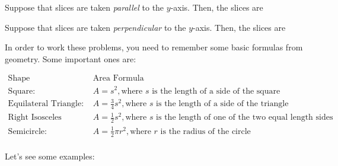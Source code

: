 \documentclass{ximera}
\begin{document}
\begin{question}
Suppose that slices are taken \emph{parallel} to the $y$-axis.  Then, the slices are
\begin{multipleChoice}
\end{multipleChoice}

Suppose that slices are taken \emph{perpendicular} to the $y$-axis.  Then, the slices are
\begin{multipleChoice}
\end{multipleChoice}
\end{question}

\begin{remark}
In order to work these problems, you need to remember some basic formulas from geometry.  Some important ones are:

\[
\begin{array}{ll}
\textrm{Shape} & \textrm{Area Formula} \\
\textrm{Square:} & A=s^2, \textrm{where } s \textrm{ is the length of a side of the square} \\ 
\textrm{Equilateral Triangle:} & A=\frac{3}{4} s^2, \textrm{where } s \textrm{ is the length of a side of the triangle} \\ 
\textrm{Right Isosceles Triangle:} & A=\frac{1}{2} s^2, \textrm{where } s \textrm{ is the length of one of the two equal length sides} \\ 
\textrm{Semicircle:} & A=\frac{1}{2} \pi r^2, \textrm{where } r \textrm{ is the radius of the circle} \\
\end{array}
\]

\end{remark}




Let's see some examples:
\end{document}
